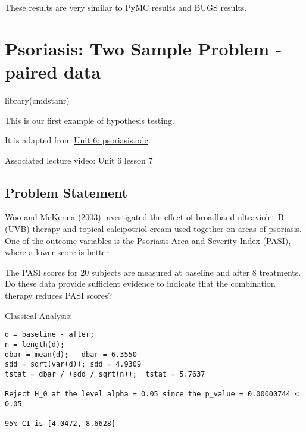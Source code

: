 \documentclass[
  letterpaper,
  DIV=11,
  numbers=noendperiod]{scrreprt}
\newenvironment{Shaded}{\begin{snugshade}}{\end{snugshade}}
\newcommand{\FunctionTok}[1]{\textcolor[rgb]{0.28,0.35,0.67}{#1}}
\newcommand{\NormalTok}[1]{\textcolor[rgb]{0.00,0.23,0.31}{#1}}
\begin{document}
These results are very similar to PyMC results and BUGS results.

\hypertarget{psoriasis-two-sample-problem---paired-data}{%
\chapter*{Psoriasis: Two Sample Problem - paired
data}\label{psoriasis-two-sample-problem---paired-data}}


\begin{Shaded}
\begin{Highlighting}[]
\FunctionTok{library}\NormalTok{(cmdstanr)}
\end{Highlighting}
\end{Shaded}

This is our first example of hypothesis testing.

It is adapted from \href{../odc_files/unit6/psoriasis.odc}{Unit 6:
psoriasis.odc}.

Associated lecture video: Unit 6 lesson 7

\hypertarget{problem-statement-3}{%
\section*{Problem Statement}\label{problem-statement-3}}


Woo and McKenna (2003) investigated the effect of broadband ultraviolet
B (UVB) therapy and topical calcipotriol cream used together on areas of
psoriasis. One of the outcome variables is the Psoriasis Area and
Severity Index (PASI), where a lower score is better.

The PASI scores for 20 subjects are measured at baseline and after 8
treatments. Do these data provide sufficient evidence to indicate that
the combination therapy reduces PASI scores?

Classical Analysis:

\begin{verbatim}
d = baseline - after;
n = length(d);
dbar = mean(d);   dbar = 6.3550
sdd = sqrt(var(d)); sdd = 4.9309
tstat = dbar / (sdd / sqrt(n));  tstat = 5.7637

Reject H_0 at the level alpha = 0.05 since the p_value = 0.00000744 < 0.05

95% CI is [4.0472, 8.6628]
\end{verbatim}
\end{document}
